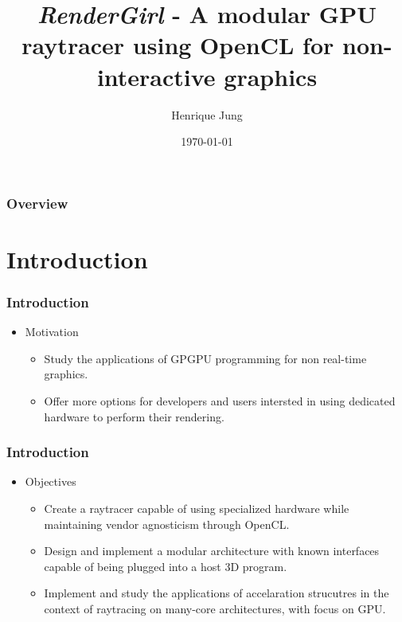 \documentclass{beamer}
\title[RenderGirl]{\emph{RenderGirl} - A modular GPU raytracer using OpenCL for non-interactive graphics}
\author{Henrique Jung}
\institute[Unisinos]
{
Universidade do Vale do Rio dos Sinos \\
\medskip
\textit{henriquenj@gmail.com}
}
\date{\today}
\begin{document}

\begin{frame}
\titlepage %
\end{frame}

\begin{frame}
\frametitle{Overview}
\tableofcontents
\end{frame}

\section{Introduction}

\begin{frame}
\frametitle{Introduction}

\begin{itemize}
\item Motivation

\begin{itemize}
\item Study the applications of GPGPU programming for non real-time
  graphics.
\item Offer more options for developers and users intersted in using
  dedicated hardware to perform their rendering.
\end{itemize}

\end{itemize}

\frametitle{Introduction}

\begin{itemize}
\item Objectives
\begin{itemize}
\item Create a raytracer capable of using specialized hardware while
  maintaining vendor agnosticism through OpenCL.
\item Design and implement a modular architecture with known
  interfaces capable of being plugged into a host 3D program.
\item Implement and study the applications of accelaration strucutres
  in the context of raytracing on many-core architectures, with focus
  on GPU.
\end{itemize}
\end{itemize}

\end{frame}
\end{document}
